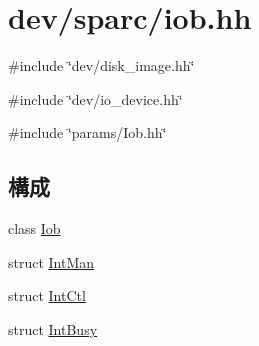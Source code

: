 \hypertarget{iob_8hh}{
\section{dev/sparc/iob.hh}
\label{iob_8hh}
}
{\ttfamily \#include \char`\"{}dev/disk\_\-image.hh\char`\"{}}\par
{\ttfamily \#include \char`\"{}dev/io\_\-device.hh\char`\"{}}\par
{\ttfamily \#include \char`\"{}params/Iob.hh\char`\"{}}\par
\subsection*{構成}
\begin{DoxyCompactItemize}
\item 
class \hyperlink{classIob}{Iob}
\item 
struct \hyperlink{structIob_1_1IntMan}{IntMan}
\item 
struct \hyperlink{structIob_1_1IntCtl}{IntCtl}
\item 
struct \hyperlink{structIob_1_1IntBusy}{IntBusy}
\end{DoxyCompactItemize}
